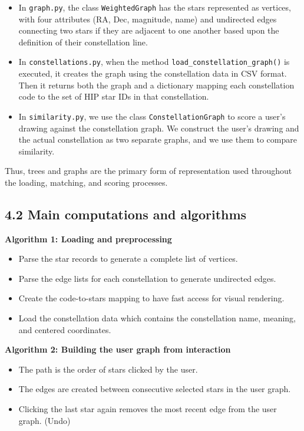 \documentclass[11pt]{article}
\begin{document}
\begin{itemize}
    \item In \texttt{graph.py}, the class \texttt{WeightedGraph} has the stars represented as vertices, with four attributes (RA, Dec, magnitude, name) and undirected edges connecting two stars if they are adjacent to one another based upon the definition of their constellation line.
    \item In \texttt{constellations.py},  when the method \texttt{load\_constellation\_graph()} is executed, it creates the graph using the constellation data in CSV format. Then it returns both the graph and a dictionary mapping each constellation code to the set of HIP star IDs in that constellation.
    \item In \texttt{similarity.py}, we use the class \texttt{ConstellationGraph} to score a user's drawing against the constellation graph. We construct the user's drawing and the actual constellation as two separate graphs, and we use them to compare similarity.
\end{itemize}

Thus, trees and graphs are the primary form of representation used throughout the loading, matching, and scoring processes.

\subsection*{4.2 Main computations and algorithms}

\textbf{Algorithm 1: Loading and preprocessing}
\begin{itemize}
    \item Parse the star records to generate a complete list of vertices.
    \item Parse the edge lists for each constellation to generate undirected edges.
    \item Create the code-to-stars mapping to have fast access for visual rendering.
    \item Load the constellation data which contains the constellation name, meaning, and centered coordinates.
\end{itemize}

\textbf{Algorithm 2: Building the user graph from interaction}
\begin{itemize}
    \item The path is the order of stars clicked by the user.
    \item The edges are created between consecutive selected stars in the user graph.
    \item Clicking the last star again removes the most recent edge from the user graph. (Undo)
\end{itemize}
\end{document}
